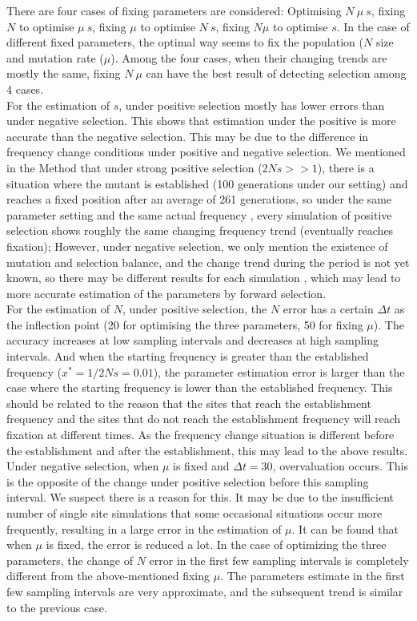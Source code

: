 \documentclass[12pt]{article}
\begin{document}
There are four cases of fixing parameters are considered: Optimising $N\ \mu\ s$, fixing $N$ to optimise $\mu\ s$, fixing $\mu$ to optimise $N\ s$, fixing $N \mu$ to optimise $s$. In the case of different fixed parameters, the optimal way seems to fix the population ($N$ size and mutation rate ($\mu$). Among the four cases, when their changing trends are mostly the same, fixing $N\ \mu$ can have the best result of detecting selection among 4 cases.\\

For the estimation of $s$, under positive selection mostly has lower errors than under negative selection. This shows that estimation under the positive is more accurate than the negative selection.  This may be due to the difference in frequency change conditions under positive and negative selection. We mentioned in the Method that under strong positive selection ($2Ns>>1$), there is a situation where the mutant is established (100 generations under our setting) and reaches a fixed position after an average of 261 generations, so under the same parameter setting and the same actual frequency , every simulation of positive selection shows roughly the same changing frequency trend (eventually reaches fixation); However, under negative selection, we only mention the existence of mutation and selection balance, and the change trend during the period is not yet known, so there may be different results for each simulation , which may lead to more accurate estimation of the parameters by forward selection.\\

For the estimation of $N$, under positive selection, the $N$ error has a certain $\Delta t$ as the inflection point (20 for optimising the three parameters, 50 for fixing $\mu$). The accuracy increases at low sampling intervals and decreases at high sampling intervals. And when the starting frequency is greater than the established frequency ($x^*=1/2Ns=0.01$), the parameter estimation error is larger than the case where the starting frequency is lower than the established frequency. This should be related to the reason that the sites that reach the establishment frequency and the sites that do not reach the establishment frequency will reach fixation at different times. As the frequency change situation is different before the establishment and after the establishment, this may lead to the above results.\\

Under negative selection, when $\mu$ is fixed and $\Delta t=30$, overvaluation occurs. This is the opposite of the change under positive selection before this sampling interval. We suspect there is a reason for this. It may be due to the insufficient number of single site simulations that some occasional situations occur more frequently, resulting in a large error in the estimation of $\mu$. It can be found that when $\mu$ is fixed, the error is reduced a lot. In the case of optimizing the three parameters, the change of $N$ error in the first few sampling intervals is completely different from the above-mentioned fixing $\mu$. The parameters estimate in the first few sampling intervals are very approximate, and the subsequent trend is similar to the previous case.\\
\end{document}
